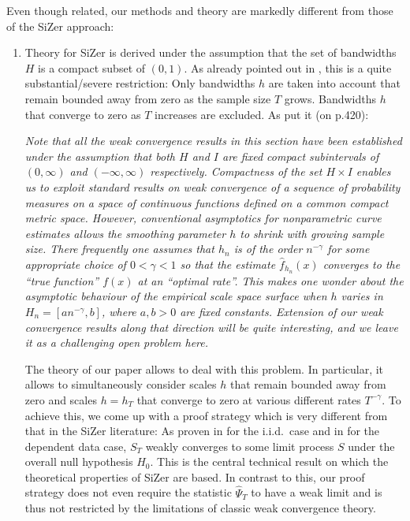 \documentclass[a4paper,12pt]{article}
\begin{document}
Even though related, our methods and theory are markedly different from those of the SiZer approach:
\begin{enumerate}[label=(\roman*), leftmargin=0.8cm]

\item Theory for SiZer is derived under the assumption that the set of bandwidths $H$ is a compact subset of $(0,1)$. As already pointed out in \cite{ChaudhuriMarron2000}, this is a quite substantial/severe restriction: Only bandwidths $h$ are taken into account that remain bounded away from zero as the sample size $T$ grows. Bandwidths $h$ that converge to zero as $T$ increases are excluded.  As \cite{ChaudhuriMarron2000} put it (on p.420):
\vspace{0.15cm}

\begin{spacing}{1.0}
{\small \textit{Note that all the weak convergence results in this section have been established under the assumption that both $H$ and $I$ are fixed compact subintervals of $(0,\infty)$ and $(-\infty,\infty)$ respectively. Compactness of the set $H \times I$ enables us to exploit standard results on weak convergence of a sequence of probability measures on a space of continuous functions defined on a common compact metric space. However, conventional asymptotics for nonparametric curve estimates allows the smoothing parameter $h$ to shrink with growing sample size. There frequently one assumes that $h_n$ is of the order $n^{-\gamma}$ for some appropriate choice of $0 < \gamma < 1$ so that the estimate $\hat{f}_{h_n}(x)$ converges to the ``true function'' $f(x)$ at an ``optimal rate''. This makes one wonder about the asymptotic behaviour of the empirical scale space surface when $h$ varies in $H_n = [a n^{-\gamma},b]$, where $a,b > 0$ are fixed constants. Extension of our weak convergence results along that direction will be quite interesting, and we leave it as a challenging open problem here.} }
\end{spacing} 
\vspace{0.2cm}

The theory of our paper allows to deal with this problem. In particular, it allows to simultaneously consider scales $h$ that remain bounded away from zero and scales $h = h_T$ that converge to zero at various different rates $T^{-\gamma}$. To achieve this, we come up with a proof strategy which is very different from that in the SiZer literature:  As proven in \cite{ChaudhuriMarron2000} for the i.i.d.\ case and in \cite{ParkHannigKang2009} for the dependent data case, $S_T$ weakly converges to some limit process $S$ under the overall null hypothesis $H_0$. This is the central technical result on which the theoretical properties of SiZer are based. In contrast to this, our proof strategy does not even require the statistic $\widehat{\Psi}_T$ to have a weak limit and is thus not restricted by the limitations of classic weak convergence theory. 


\end{enumerate}
\end{document}

